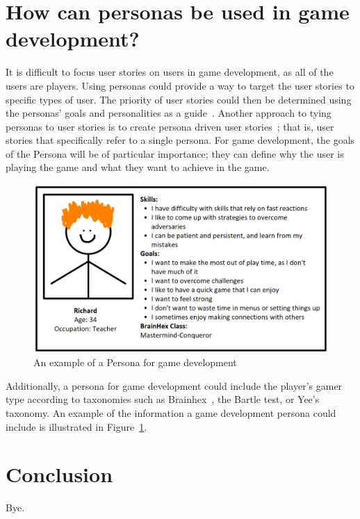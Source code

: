 \documentclass{scrartcl}
\begin{document}

\section{How can personas be used in game development?}
It is difficult to focus user stories on users in game development, as all of the users are players. Using personas could provide a way to target the user stories to specific types of user. The priority of user stories could then be determined using the personas' goals and personalities as a guide~\cite{microsoft thing}. 
Another approach to tying personas to user stories is to create persona driven user stories~\cite{winter:vision}; that is, user stories that specifically refer to a single persona. For game development, the goals of the Persona will be of particular importance; they can define why the user is playing the game and what they want to achieve in the game. 
\begin{figure}[h]
\includegraphics[width=\textwidth]{example.png}
\caption{An example of a Persona for game development}
\label{fig:persona_example}
\end{figure} 
Additionally, a persona for game development could include the player's gamer type according to taxonomies such as Brainhex~\cite{nacke:brainhex}, the Bartle test\cite{bartle:mud}, or Yee's taxonomy\cite{yee:online}.  An example of the information a game development persona could include is illustrated in Figure~\ref{fig:persona_example}. 




\section{Conclusion}
Bye.



\end{document}
